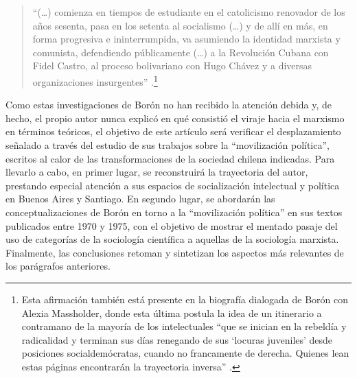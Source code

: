 \begin{quote}
\enquote{(\dots) comienza en tiempos de estudiante en el catolicismo renovador de los años sesenta, pasa en los setenta al socialismo (\dots) y de allí en más, en forma progresiva e ininterrumpida, va asumiendo la identidad marxista y comunista, defendiendo públicamente (\dots) a la Revolución Cubana con Fidel Castro, al proceso bolivariano con Hugo Chávez y a diversas organizaciones insurgentes} \parencite[58]{1689-KOHAN2015}.\footnote{Esta afirmación también está presente en la biografía dialogada de Borón con Alexia Massholder, donde esta última postula la idea de un itinerario a contramano de la mayoría de los intelectuales \enquote{que se inician en la rebeldía y radicalidad y terminan sus días renegando de sus \enquote{locuras juveniles} desde posiciones socialdemócratas, cuando no francamente de derecha. Quienes lean estas páginas encontrarán la trayectoria inversa} \parencite[8]{1444-BORON2023}.}
\end{quote}

Como estas investigaciones de Borón no han recibido la atención debida y, de hecho, el propio autor nunca explicó en qué consistió el viraje hacia el marxismo en términos teóricos, el objetivo de este artículo será verificar el desplazamiento señalado a través del estudio de sus trabajos sobre la \enquote{movilización política}, escritos al calor de las transformaciones de la sociedad chilena indicadas. Para llevarlo a cabo, en primer lugar, se reconstruirá la trayectoria del autor, prestando especial atención a sus espacios de socialización intelectual y política en Buenos Aires y Santiago. En segundo lugar, se abordarán las conceptualizaciones de Borón en torno a la \enquote{movilización política} en sus textos publicados entre 1970 y 1975, con el objetivo de mostrar el mentado pasaje del uso de categorías de la sociología científica a aquellas de la sociología marxista. Finalmente, las conclusiones retoman y sintetizan los aspectos más relevantes de los parágrafos anteriores.

